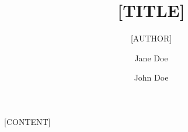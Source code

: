 \documentclass{charite}
\author{Jane Doe \and 
	John Doe %
}
\title{[TITLE]}
\subtitle{[AUTHOR]}
\begin{document}
    
	\charitetitle
	
    \tableofcontents
    \clearpage
    
    [CONTENT]
\end{document}
